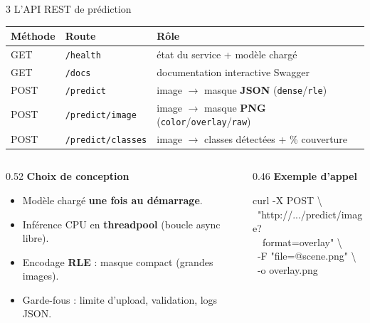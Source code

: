 \documentclass[aspectratio=169,11pt]{beamer}
\newcommand{\emphc}[1]{\textbf{\color{cvblue}#1}}
\newcommand{\code}[1]{\texttt{\small #1}}
\begin{document}
\begin{frame}{3 \textbar{} L'API REST de prédiction}
  \centering
  {\small
  \renewcommand{\arraystretch}{1.1}
  \begin{tabular}{@{}llp{5.4cm}@{}}
    \toprule
    \textbf{Méthode} & \textbf{Route} & \textbf{Rôle} \\
    \midrule
    GET  & \code{/health}          & état du service + modèle chargé \\
    GET  & \code{/docs}            & documentation interactive Swagger \\
    POST & \code{/predict}         & image $\rightarrow$ masque \textbf{JSON} (\code{dense}/\code{rle}) \\
    POST & \code{/predict/image}   & image $\rightarrow$ masque \textbf{PNG} (\code{color}/\code{overlay}/\code{raw}) \\
    POST & \code{/predict/classes} & image $\rightarrow$ classes détectées + \% couverture \\
    \bottomrule
  \end{tabular}}
  \vspace{0.5em}
  \begin{columns}[T]
    \begin{column}{0.52\textwidth}
      \textbf{\small Choix de conception}
      \begin{itemize}\scriptsize
        \item Modèle chargé \emphc{une fois au démarrage}.
        \item Inférence CPU en \emphc{threadpool} (boucle async libre).
        \item Encodage \emphc{RLE} : masque compact (grandes images).
        \item Garde-fous : limite d'upload, validation, logs JSON.
      \end{itemize}
    \end{column}
    \begin{column}{0.46\textwidth}
      \textbf{\small Exemple d'appel}\\[2pt]
      \begin{block}{}
        \scriptsize\ttfamily
        curl -X POST \textbackslash\\
        \ "http://.../predict/image?\\
        \ \ format=overlay" \textbackslash\\
        \ -F "file=@scene.png" \textbackslash\\
        \ -o overlay.png
      \end{block}
    \end{column}
  \end{columns}
\end{frame}
\end{document}
